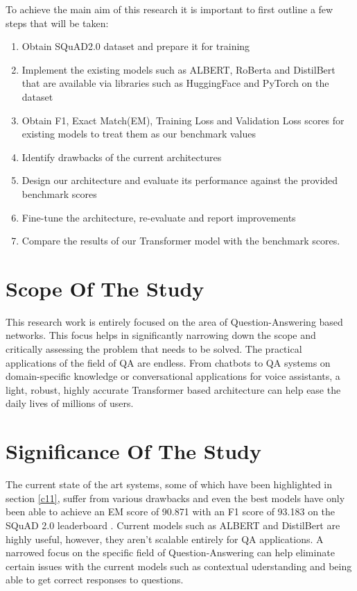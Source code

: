 \documentclass[a4paper,12pt]{report}
\begin{document}
        	To achieve the main aim of this research it  is important to first outline a few steps that will be taken:
        \begin{enumerate}
        	\item Obtain SQuAD2.0 dataset and prepare it for training
        	\item Implement the existing models such as ALBERT, RoBerta and DistilBert that are available via libraries such as HuggingFace \citep{hfTransformers} and PyTorch  on the dataset
        	\item Obtain F1, Exact Match(EM), Training Loss and Validation Loss scores for existing models to treat them as our benchmark values
        	\item Identify drawbacks of the current architectures
        	\item Design our architecture and evaluate its performance against the provided benchmark scores
        	\item Fine-tune the architecture, re-evaluate and report improvements
        	\item Compare the results of our Transformer model with the benchmark scores.
        \end{enumerate}

        \section{Scope Of The Study}\label{13}

        This research work is entirely focused on the area of Question-Answering based networks. This focus helps in significantly narrowing down the scope and critically assessing the problem that needs to be solved. The practical applications of the field of QA are endless. From chatbots to QA systems on domain-specific knowledge or conversational applications for voice assistants, a light, robust, highly accurate Transformer based architecture can help ease the daily lives of millions of users.
        
        \section{Significance Of The Study}\label{14}

        The current state of the art systems, some of which have been highlighted in section \ref{c11}, suffer from various drawbacks and even the best models have only been able to achieve an EM score of 90.871 with an F1 score of 93.183 on the SQuAD 2.0 leaderboard \citep{squad}. Current models such as ALBERT and DistilBert are highly useful, however, they aren't scalable entirely for QA applications. A narrowed focus on the specific field of Question-Answering can help eliminate certain issues with the current models such as contextual uderstanding and being able to get correct responses to questions. 
        
\end{document}
